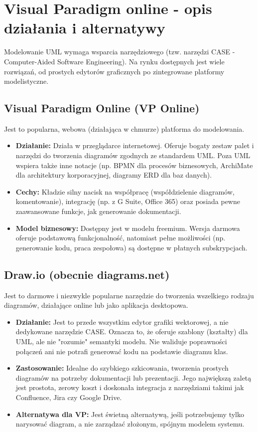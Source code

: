 \documentclass[a4paper,12pt]{article}
\begin{document}
\section{Visual Paradigm online - opis działania i alternatywy}

Modelowanie UML wymaga wsparcia narzędziowego (tzw. narzędzi CASE - Computer-Aided Software Engineering). Na rynku dostępnych jest wiele rozwiązań, od prostych edytorów graficznych po zintegrowane platformy modelistyczne.

\subsection{Visual Paradigm Online (VP Online)}

Jest to popularna, webowa (działająca w chmurze) platforma do modelowania.
\begin{itemize}
    \item \textbf{Działanie:} Działa w przeglądarce internetowej. Oferuje bogaty zestaw palet i narzędzi do tworzenia diagramów zgodnych ze standardem UML. Poza UML wspiera także inne notacje (np. BPMN dla procesów biznesowych, ArchiMate dla architektury korporacyjnej, diagramy ERD dla baz danych).
    \item \textbf{Cechy:} Kładzie silny nacisk na współpracę (współdzielenie diagramów, komentowanie), integrację (np. z G Suite, Office 365) oraz posiada pewne zaawansowane funkcje, jak generowanie dokumentacji.
    \item \textbf{Model biznesowy:} Dostępny jest w modelu freemium. Wersja darmowa oferuje podstawową funkcjonalność, natomiast pełne możliwości (np. generowanie kodu, praca zespołowa) są dostępne w płatnych subskrypcjach.
\end{itemize}

\subsection{Draw.io (obecnie diagrams.net)}

Jest to darmowe i niezwykle popularne narzędzie do tworzenia wszelkiego rodzaju diagramów, działające online lub jako aplikacja desktopowa.
\begin{itemize}
    \item \textbf{Działanie:} Jest to przede wszystkim edytor grafiki wektorowej, a nie dedykowane narzędzie CASE. Oznacza to, że oferuje szablony (kształty) dla UML, ale nie "rozumie" semantyki modelu. Nie waliduje poprawności połączeń ani nie potrafi generować kodu na podstawie diagramu klas.
    \item \textbf{Zastosowanie:} Idealne do szybkiego szkicowania, tworzenia prostych diagramów na potrzeby dokumentacji lub prezentacji. Jego największą zaletą jest prostota, zerowy koszt i doskonała integracja z narzędziami takimi jak Confluence, Jira czy Google Drive.
    \item \textbf{Alternatywa dla VP:} Jest świetną alternatywą, jeśli potrzebujemy tylko narysować diagram, a nie zarządzać złożonym, spójnym modelem systemu.
\end{itemize}
\end{document}
